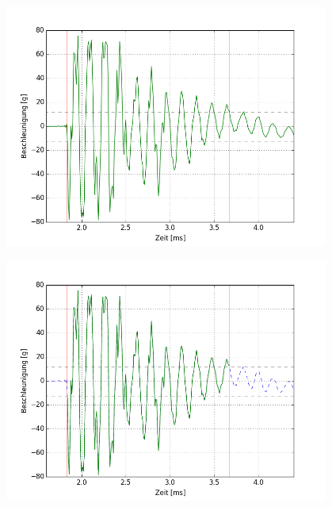 \begin{figure}
\centering
\begin{minipage}{0.5\textwidth}
\centering
		\includegraphics[width=0.95\textwidth]{images/rawshort.png}
	\label{fig.det_raw}
\end{minipage}%
\begin{minipage}{0.5\textwidth}
\centering
		\includegraphics[width=0.95\textwidth]{images/detailed.png}
	\label{fig.det_det}
\end{minipage}
\end{figure}

